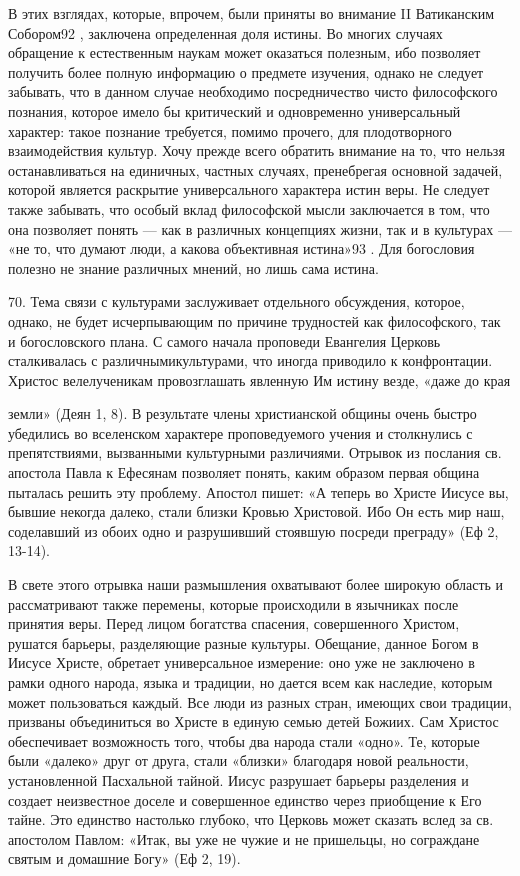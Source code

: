 \documentclass[a5paper,10pt]{article}
\begin{document}
В этих взглядах, которые, впрочем, были приняты во внимание II Ватиканским
Собором92 , заключена определенная доля истины. Во многих случаях обращение к
естественным наукам может оказаться полезным, ибо позволяет получить более
полную информацию о предмете изучения, однако не следует забывать, что в данном
случае необходимо посредничество чисто философского познания, которое имело бы
критический и одновременно универсальный характер: такое познание требуется,
помимо прочего, для плодотворного взаимодействия культур. Хочу прежде всего
обратить внимание на то, что нельзя останавливаться на единичных, частных
случаях, пренебрегая основной задачей, которой является раскрытие
универсального характера истин веры. Не следует также забывать, что особый
вклад философской мысли заключается в том, что она позволяет понять — как в
различных концепциях жизни, так и в культурах — «не то, что думают люди, а
какова объективная истина»93 . Для богословия полезно не знание различных
мнений, но лишь сама истина.

70. Тема связи с культурами заслуживает отдельного обсуждения, которое, однако,
не будет исчерпывающим по причине трудностей как философского, так и
богословского плана. С самого начала проповеди Евангелия Церковь сталкивалась с
различнымикультурами, что иногда приводило к конфронтации. Христос
велелученикам провозглашать явленную Им истину везде, «даже до края

земли» (Деян 1, 8). В результате члены христианской общины очень быстро
убедились во вселенском характере проповедуемого учения и столкнулись с
препятствиями, вызванными культурными различиями. Отрывок из послания св.
апостола Павла к Ефесянам позволяет понять, каким образом первая община
пыталась решить эту проблему. Апостол пишет: «А теперь во Христе Иисусе вы,
бывшие некогда далеко, стали близки Кровью Христовой. Ибо Он есть мир наш,
соделавший из обоих одно и разрушивший стоявшую посреди преграду» (Еф 2,
13-14).

В свете этого отрывка наши размышления охватывают более широкую область и
рассматривают также перемены, которые происходили в язычниках после принятия
веры. Перед лицом богатства спасения, совершенного Христом, рушатся барьеры,
разделяющие разные культуры. Обещание, данное Богом в Иисусе Христе, обретает
универсальное измерение: оно уже не заключено в рамки одного народа, языка и
традиции, но дается всем как наследие, которым может пользоваться каждый. Все
люди из разных стран, имеющих свои традиции, призваны объединиться во Христе в
единую семью детей Божиих. Сам Христос обеспечивает возможность того, чтобы два
народа стали «одно». Те, которые были «далеко» друг от друга, стали «близки»
благодаря новой реальности, установленной Пасхальной тайной. Иисус разрушает
барьеры разделения и создает неизвестное доселе и совершенное единство через
приобщение к Его тайне. Это единство настолько глубоко, что Церковь может
сказать вслед за св. апостолом Павлом: «Итак, вы уже не чужие и не пришельцы,
но сограждане святым и домашние Богу» (Еф 2, 19).
\end{document}
